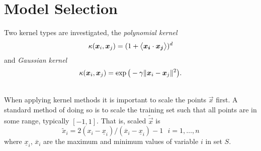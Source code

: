 
\section{Model Selection}

Two kernel types  are investigated, the
\emph{polynomial kernel}
\begin{equation}
\kappa(\vec{x}_i,\vec{x}_j) = (1 + \inner{x_i}{x_j})^d
\end{equation}
and \emph{Gaussian kernel}
\begin{equation}
\kappa(\vec{x}_i,\vec{x}_j) = \exp\big(-\gamma \norm{\vec{x}_i-\vec{x}_j}^2\big).
\end{equation}

\ \\
When applying kernel methods it is important to scale the
points $\vec{x}$ first. A standard method of doing so is to
scale the training set such that all points are in some range,
typically $[-1,1]$. That is, scaled $\tilde{\vec{x}}$ is
\begin{equation}
\tilde x_i = 2 (x_i - \underline{x}_i) / (\overline{x}_i -
\underline{x}_i) - 1 ~~~ i = 1,\ldots,n
\end{equation}
where $\underline{x}_i$, $\overline{x}_i$ are the maximum and
minimum values of variable $i$ in set $S$.

